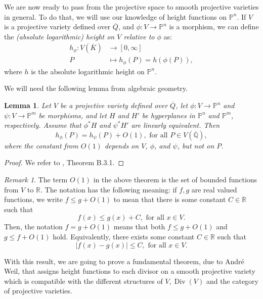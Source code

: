 \documentclass[a4paper, 12pt]{amsart}
\theoremstyle{definition}
\theoremstyle{plain}
\theoremstyle{plain}
\theoremstyle{plain}
\newtheorem{lemma0}[defn0]{Lemma}
\theoremstyle{plain}
\theoremstyle{remark}
\theoremstyle{remark}
\newtheorem{remark0}[defn0]{Remark}
\theoremstyle{plain}
\newenvironment{lemma}{ \begin{lemma0}}{\end{lemma0}}
\newenvironment{remark}{ \begin{remark0}\rm}{\end{remark0}}
\newcommand{\Q}{\mathbb{Q}}
\DeclareMathOperator{\Div}{Div}
\begin{document}
	We are now ready to pass from the projective space to smooth projective varieties in general. To do that, we will use our knowledge of height functions on $\mathbb{P}^n$. If $V$ is a projective variety defined over $\overline{Q}$, and $\phi:V\rightarrow \mathbb{P}^n$ is a morphism, we can define the \emph{(absolute logarithmic) height on $V$ relative to $\phi$} as:
	\begin{align*}
		h_\phi:V(\overline{K})&\rightarrow [0,\infty]\\
		P&\mapsto h_\phi(P)=h(\phi(P)),
	\end{align*}
	where $h$ is the absolute logarithmic height on $\mathbb{P}^n$.
	
	We will need the following lemma from algebraic geometry.
	\begin{lemma}\label{O1lemma}
		Let $V$ be a projective variety defined over $\overline{Q}$, let $\phi:V\rightarrow\mathbb{P}^n$ and $\psi:V\rightarrow\mathbb{P}^m$ be morphisms, and let $H$ and $H'$ be hyperplanes in $\mathbb{P}^n$ and $\mathbb{P}^m$, respectively. Assume that $\phi^*H$ and $\psi^*H'$ are linearly equivalent. Then
		\begin{equation*}
			h_\phi(P)=h_\psi(P)+O(1), \text{ for all } P\in V(\overline{\Q}),
		\end{equation*}
		where the constant from $O(1)$ depends on $V$, $\phi$, and $\psi$, but not on $P$.
	\end{lemma}
	\begin{proof}
		We refer to \cite{Hindry_Silverman_2000}, Theorem B.3.1.
	\end{proof}
	\begin{remark}
		The term $O(1)$ in the above theorem is the set of bounded functions from $V$ to $\mathbb{R}$. The notation has the following meaning: if $f,g$ are real valued functions, we write $f\le g+O(1)$ to mean that there is some constant $C\in\mathbb{R}$ such that
		\begin{equation*}
			f(x)\le g(x)+C, \text{ for all }x\in V.
		\end{equation*}
		Then, the notation $f=g+O(1)$ means that both $f\le g+O(1)$ and $g\le f+O(1)$ hold. Equivalently, there exists some constant $C\in\mathbb{R}$ such that
		\begin{equation*}
			|f(x)-g(x)|\le C, \text{ for all }x\in V.
		\end{equation*}
	\end{remark}
	
	
	With this result, we are going to prove a fundamental theorem, due to André Weil, that assigns height functions to each divisor on a smooth projective variety which is compatible with the different structures of $V,\Div(V)$ and the category of projective varieties.
	
\end{document}
